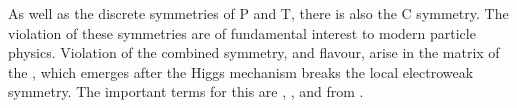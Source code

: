 As well as the discrete symmetries of \gls{P} and \gls{T}, there is also the \gls{C} symmetry.
The violation of these symmetries are of fundamental interest
to modern particle physics.
Violation of the combined \CP symmetry, and flavour, arise in the \ckm matrix of the \sm, which emerges
after the Higgs mechanism breaks the local electroweak symmetry.
The important terms for this are , \deleted{(}, and  from .

